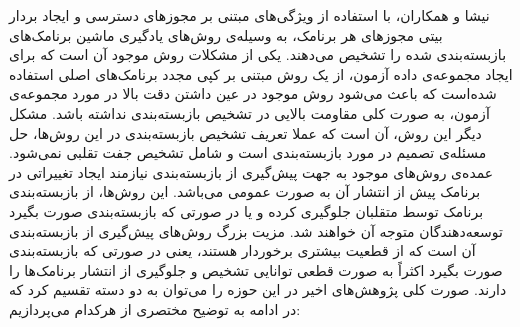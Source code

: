 نیشا و همکاران، با استفاده از ویژگی‌های مبتنی بر مجوز‌‌های دسترسی و ایجاد بردار بیتی مجوز‌های هر برنامک، به وسیله‌ی روش‌های یاد‌گیری ماشین برنامک‌های بازبسته‌بندی شده را تشخیص می‌دهند. یکی از مشکلات روش موجود آن است که برای ایجاد مجموعه‌ی داده آزمون، از یک روش مبتنی بر کپی مجدد برنامک‌های اصلی استفاده شده‌است که باعث می‌شود روش موجود در عین داشتن دقت بالا در مورد مجموعه‌ی آزمون، به صورت کلی مقاومت بالایی در تشخیص بازبسته‌بندی نداشته باشد. مشکل دیگر این روش، آن است که عملا تعریف تشخیص بازبسته‌بندی در این روش‌ها، حل مسئله‌ی تصمیم در مورد بازبسته‌بندی است و شامل تشخیص جفت تقلبی نمی‌شود.
عمده‌ی روش‌های موجود به جهت پیش‌گیری از بازبسته‌بندی نیازمند ایجاد تغییراتی در برنامک پیش از انتشار آن به صورت عمومی می‌باشد. این روش‌ها، از بازبسته‌بندی برنامک توسط متقلبان جلوگیری کرده و یا در صورتی که بازبسته‌بندی صورت بگیرد توسعه‌دهندگان متوجه آن خواهند‌ شد. مزیت بزرگ روش‌های پیش‌گیری از بازبسته‌بندی آن‌ است که از قطعیت بیشتری برخوردار هستند، یعنی در صورتی که بازبسته‌بندی صورت بگیرد اکثراً به صورت قطعی توانایی تشخیص و جلوگیری از انتشار برنامک‌ها را دارند.  صورت کلی پژوهش‌های اخیر در این حوزه را می‌توان به دو دسته تقسیم کرد که در ادامه به توضیح مختصری از هر‌کدام می‌پردازیم:


	
